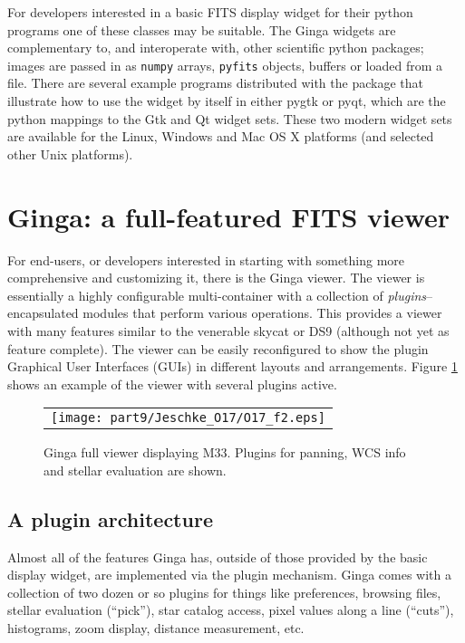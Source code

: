 For developers interested in a basic FITS display widget for their
python programs one of these classes may be suitable.
The Ginga widgets are complementary to, and interoperate with, other
scientific python packages; images are passed in as {\tt numpy} arrays,
{\tt pyfits} objects, buffers or loaded from a file.  
There are several 
example programs distributed with the package that illustrate how
to use the widget by itself in either pygtk or pyqt, which are the
python mappings to the Gtk and Qt widget sets. 
These two modern widget sets are available for the Linux, Windows and
Mac OS X platforms (and selected other Unix platforms).

\section{Ginga: a full-featured FITS viewer}
For end-users, or developers interested in starting with something more
comprehensive and customizing it, there is the Ginga viewer.  The viewer is
essentially a highly configurable multi-container with a collection of
\emph{plugins}--encapsulated modules that perform various operations.
This provides a viewer with many features similar to the venerable
skycat \citep{skycat} or DS9 (although not yet as feature complete).
The viewer can be easily reconfigured to show the plugin Graphical User
Interfaces (GUIs) in different layouts and arrangements.  
Figure \ref{fig:ginga} shows an example of the viewer with several
plugins active. 
\begin{figure}
  \begin{center}
    \begin{tabular}{c}
      \texttt{[image: part9/Jeschke\_O17/O17\_f2.eps]}
    \end{tabular}
  \end{center}
  \caption[example] 
          { \label{fig:ginga} 
            Ginga full viewer displaying M33. Plugins for panning, WCS
            info and stellar evaluation are shown.} 
\end{figure} 

\subsection{A plugin architecture}
Almost all of the features Ginga has, outside of those provided by the
basic display widget, are implemented via the plugin mechanism.
Ginga comes with a collection of two dozen or so plugins for things
like preferences, browsing files, stellar evaluation (``pick''), star
catalog access, pixel values along a line (``cuts''), histograms,
zoom display, distance measurement, etc.

